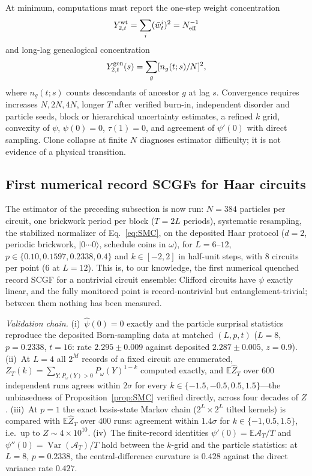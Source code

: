 \documentclass[aps,prx,reprint,superscriptaddress,nobibnotes,longbibliography]{revtex4-2}
\theoremstyle{remark}
\newcommand{\E}{\mathbb E}
\begin{document}
At minimum, computations must report the one-step weight concentration
\begin{equation}
 Y_{2,t}^{\rm wt}=\sum_i(\bar w_t^i)^2=N_{\rm eff}^{-1}
\end{equation}
and long-lag genealogical concentration
\begin{equation}
 Y_{2,t}^{\rm gen}(s)=\sum_g[n_g(t;s)/N]^2,
\end{equation}
where $n_g(t;s)$ counts descendants of ancestor $g$ at lag $s$.  Convergence requires increases $N,2N,4N$, longer $T$ after verified burn-in, independent disorder and particle seeds, block or hierarchical uncertainty estimates, a refined $k$ grid, convexity of $\psi$, $\psi(0)=0$, $\tau(1)=0$, and agreement of $\psi'(0)$ with direct sampling.  Clone collapse at finite $N$ diagnoses estimator difficulty; it is not evidence of a physical transition.

\subsection{First numerical record SCGFs for Haar circuits}
\label{sec:smcnumerics}

The estimator of the preceding subsection is now run: $N=384$ particles per circuit, one brickwork period per block ($T=2L$ periods), systematic resampling, the stabilized normalizer of Eq.~\eqref{eq:SMC}, on the deposited Haar protocol ($d=2$, periodic brickwork, $|0\cdots0\rangle$, schedule coins in $\omega$), for $L=6$--$12$, $p\in\{0.10,0.1597,0.2338,0.4\}$ and $k\in[-2,2]$ in half-unit steps, with $8$ circuits per point ($6$ at $L=12$).  This is, to our knowledge, the first numerical quenched record SCGF for a nontrivial circuit ensemble: Clifford circuits have $\psi$ exactly linear, and the fully monitored point is record-nontrivial but entanglement-trivial; between them nothing has been measured.

\emph{Validation chain.}  (i)~$\widehat\psi(0)=0$ exactly and the particle surprisal statistics reproduce the deposited Born-sampling data at matched $(L,p,t)$ ($L=8$, $p=0.2338$, $t=16$: rate $2.295\pm0.009$ against deposited $2.287\pm0.005$, $z=0.9$).  (ii)~At $L=4$ all $2^M$ records of a fixed circuit are enumerated, $Z_T(k)=\sum_{Y:P_\omega(Y)>0}P_\omega(Y)^{1-k}$ computed exactly, and $\E\widehat Z_T$ over $600$ independent runs agrees within $2\sigma$ for every $k\in\{-1.5,-0.5,0.5,1.5\}$---the unbiasedness of Proposition~\ref{prop:SMC} verified directly, across four decades of $Z$.  (iii)~At $p=1$ the exact basis-state Markov chain ($2^L\times2^L$ tilted kernels) is compared with $\E\widehat Z_T$ over $400$ runs: agreement within $1.4\sigma$ for $k\in\{-1,0.5,1.5\}$, i.e.\ up to $Z\sim4\times10^{10}$.  (iv)~The finite-record identities $\psi'(0)=\E\mathcal A_T/T$ and $\psi''(0)=\operatorname{Var}(\mathcal A_T)/T$ hold between the $k$-grid and the particle statistics: at $L=8$, $p=0.2338$, the central-difference curvature is $0.428$ against the direct variance rate $0.427$.
\end{document}
